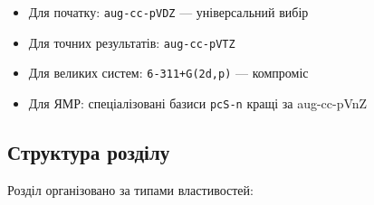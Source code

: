 \begin{itemize}
    \item Для початку: \texttt{aug-cc-pVDZ} --- універсальний вибір
    \item Для точних результатів: \texttt{aug-cc-pVTZ}
    \item Для великих систем: \texttt{6-311+G(2d,p)} --- компроміс
    \item Для ЯМР: спеціалізовані базиси \texttt{pcS-n} кращі за aug-cc-pVnZ
\end{itemize}

\subsection*{Структура розділу}

Розділ організовано за типами властивостей:

